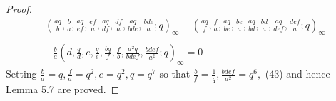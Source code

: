 \documentclass[10pt,reqno]{amsart}
\begin{document}
\begin{proof}
\begin{multline*}
    (\displaystyle\frac{aq}{b},\displaystyle\frac{b}{a},\displaystyle\frac{aq}{ef},\displaystyle\frac{ef}{a},\displaystyle\frac{aq}{df},\displaystyle\frac{df}{a},\displaystyle\frac{aq}{bde},\displaystyle\frac{bde}{a};q)_{\infty}-(\displaystyle\frac{aq}{f},\displaystyle\frac{f}{a},\displaystyle\frac{aq}{be},\displaystyle\frac{be}{a},\displaystyle\frac{aq}{bd},\displaystyle\frac{bd}{a},\displaystyle\frac{aq}{def},\displaystyle\frac{def}{a};q)_{\infty}\\ \\
    +\displaystyle\frac{b}{a}(d,\displaystyle\frac{q}{d},e,\displaystyle\frac{q}{e},\displaystyle\frac{bq}{f},\displaystyle\frac{f}{b},\displaystyle\frac{a^2q}{bdef},\displaystyle\frac{bdef}{a^2};q)_{\infty}=0
\end{multline*}
Setting $\displaystyle\frac{b}{a}=q,\displaystyle\frac{f}{a}=q^2,e=q^2,q=q^7$ so that $\displaystyle\frac{b}{f}=\displaystyle\frac{1}{q},\displaystyle\frac{bdef}{a^2}=q^6,$ (43) and hence Lemma 5.7 are proved.
\end{proof}
\end{document}
